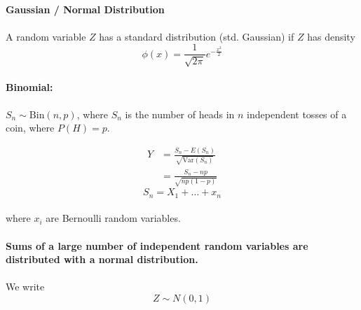 \documentclass[letterpaper,12pt]{article}
\begin{document}
   \paragraph{Gaussian / Normal Distribution} 
   \paragraph{}A random variable $Z$ has a standard distribution (std. Gaussian) if $Z$ has density
   \[
       \phi(x) = \frac{1}{\sqrt{2\pi}}e^{-\frac{x^2}{2}}
   \]

\newcommand\gauss[2]{1/(#2*sqrt(2*pi))*exp(-((x-#1)^2)/(2*#2^2))} %

\paragraph{Binomial:} $S_n \sim \mathrm{Bin}(n,p)$, where $S_n$ is the number of heads in $n$ independent
tosses of a coin, where $P(H) = p$.

\begin{align*}
    Y &= \frac{S_n - E(S_n)}{\sqrt{\mathrm{Var}(S_n)}}\\
      &= \frac{S_n - np}{\sqrt{np(1-p)}}
\end{align*}
\[
    S_n = X_1 + \ldots + x_n
\]
\paragraph{}where $x_i$ are Bernoulli random variables.
\paragraph{}\textbf{Sums of a large number of independent random variables are distributed with a normal
distribution.}
\paragraph{}We write 
\[
    Z \sim N(0,1)
\]
\end{document}
